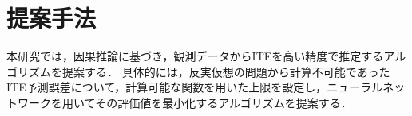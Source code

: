 \documentclass[dvipdfmx]{jreport}
\begin{document}
\section{提案手法}
本研究では，因果推論に基づき，観測データからITEを高い精度で推定するアルゴリズムを提案する．
具体的には，反実仮想の問題から計算不可能であったITE予測誤差について，計算可能な関数を用いた上限を設定し，ニューラルネットワークを用いてその評価値を最小化するアルゴリズムを提案する．
\end{document}

